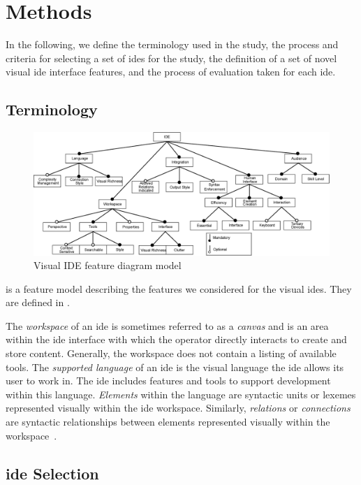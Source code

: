 \section{Methods} \label{sec:methods}

In the following, we define the terminology used in the study, the process
and criteria for selecting a set of \acp{ide} for the study, the definition
of a set of novel visual \ac{ide} interface features, and the process of
evaluation taken for each \ac{ide}.


\subsection{Terminology} \label{subsec:terminology}

\begin{figure}
  \centering
  \includegraphics[width=\textwidth]{images/ide_feature_model}
  \caption{Visual IDE feature diagram model}
  \label{fig:featuremodel}
\end{figure}
%
 is a feature model describing the features we
considered for the visual \acp{ide}. They are defined in
.

The \emph{workspace} of an \ac{ide} is sometimes referred to as a
\emph{canvas} and is an area within the \ac{ide} interface with which the
operator directly interacts to create and store content. Generally, the
workspace does not contain a listing of available tools. The
\emph{supported language} of an \ac{ide} is the visual language the
\ac{ide} allows its user to work in. The \ac{ide} includes features and
tools to support development within this language. \emph{Elements} within
the language are syntactic units or lexemes represented visually within the
\ac{ide} workspace. Similarly, \emph{relations} or \emph{connections} are
syntactic relationships between elements represented visually within the
workspace~\cite{costagliola2002}.


\subsection{\acs{ide} Selection} \label{subsec:ideselection}

